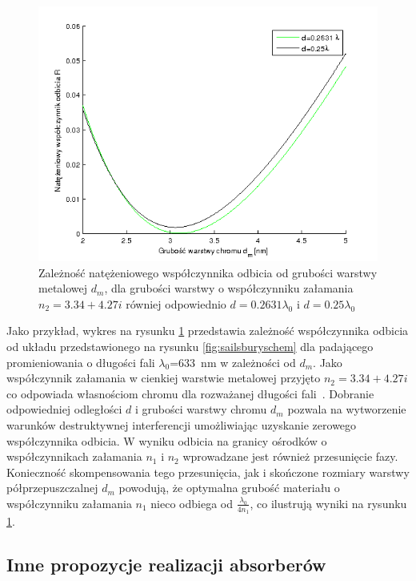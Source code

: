 \begin{figure}[htb]
	\centering
	\includegraphics[width=\textwidth]{images/pml/sailsbury-res.png}
	\caption{Zależność natężeniowego współczynnika odbicia od grubości warstwy metalowej $d_m$, dla grubości warstwy o współczynniku załamania $n_2=3.34 + 4.27i$ równiej odpowiednio $d=0.2631\lambda_0$ i $d=0.25\lambda_0$}
	\label{fig:sailsburyres}
\end{figure}

Jako przykład,  wykres na rysunku \ref{fig:sailsburyres}  przedstawia zależność współczynnika odbicia od układu przedstawionego na rysunku \ref{fig:sailsburyschem} dla padającego promieniowania o długości fali $\lambda_0$=633~nm w zależności od $d_m$. Jako współczynnik załamania w cienkiej warstwie metalowej przyjęto $n_2=3.34+4.27i$ co odpowiada własnościom chromu dla rozważanej długości fali~\cite{ordal1983optical}. Dobranie odpowiedniej odległości $d$ i grubości warstwy chromu $d_m$ pozwala na wytworzenie warunków destruktywnej interferencji umożliwiając uzyskanie zerowego współczynnika odbicia. W wyniku odbicia na granicy ośrodków o współczynnikach załamania $n_1$ i $n_2$ wprowadzane jest również przesunięcie fazy. Konieczność skompensowania tego przesunięcia, jak i skończone rozmiary warstwy półprzepuszczalnej $d_m$ powodują, że optymalna grubość materiału o współczynniku załamania $n_1$ nieco odbiega od $\frac{\lambda_0}{4 n_1}$, co ilustrują wyniki na rysunku \ref{fig:sailsburyres}. 

\subsection{Inne propozycje realizacji absorberów}

